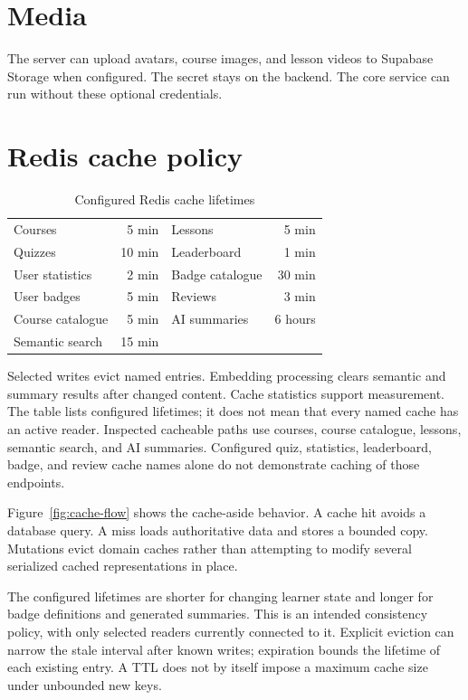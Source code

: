 \documentclass[12pt,a4paper,oneside]{report}
\begin{document}
\section{Media}
The server can upload avatars, course images, and lesson videos to Supabase Storage
when configured. The secret stays on the backend. The core service can run without
these optional credentials.

\section{Redis cache policy}
\begin{table}[H]\centering
\caption{Configured Redis cache lifetimes}\label{tab:cache}
\begin{tabular}{lr@{\qquad}lr}\toprule
Courses & 5 min & Lessons & 5 min\\
Quizzes & 10 min & Leaderboard & 1 min\\
User statistics & 2 min & Badge catalogue & 30 min\\
User badges & 5 min & Reviews & 3 min\\
Course catalogue & 5 min & AI summaries & 6 hours\\
Semantic search & 15 min & &\\\bottomrule
\end{tabular}
\end{table}
Selected writes evict named entries. Embedding processing clears semantic and summary
results after changed content. Cache statistics support measurement. The table lists
configured lifetimes; it does not mean that every named cache has an active reader.
Inspected cacheable paths use courses, course catalogue, lessons, semantic search,
and AI summaries. Configured quiz, statistics, leaderboard, badge, and review cache
names alone do not demonstrate caching of those endpoints.

Figure~\ref{fig:cache-flow} shows the cache-aside behavior. A cache hit avoids a
database query. A miss loads authoritative data and stores a bounded copy. Mutations
evict domain caches rather than attempting to modify several serialized cached
representations in place.

\cacheflowdiagram

The configured lifetimes are shorter for changing learner state and longer for badge
definitions and generated summaries. This is an intended consistency policy, with
only selected readers currently connected to it. Explicit eviction can narrow the
stale interval after known writes; expiration bounds the lifetime of each existing
entry. A TTL does not by itself impose a maximum cache size under unbounded new keys.
\end{document}
